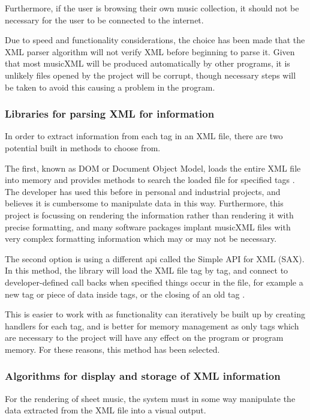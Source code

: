 Furthermore, if the user is browsing their own music collection, it should not be necessary for the user to be connected to the internet.

Due to speed and functionality considerations, the choice has been made that the XML parser algorithm will not verify XML before beginning to parse it. Given that most musicXML will be produced automatically by other programs, it is unlikely files opened by the project will be corrupt, though necessary steps will be taken to avoid this causing a problem in the program.


\subsubsection{Libraries for parsing XML for information}
In order to extract information from each tag in an XML file, there are two potential built in methods to choose from. 

The first, known as DOM or Document Object Model, loads the entire XML file into memory and provides methods to search the loaded file for specified tags \parencite{PythonDom}. The developer has used this before in personal and industrial projects, and believes it is cumbersome to manipulate data in this way. Furthermore, this project is focussing on rendering the information rather than rendering it with precise formatting, and many software packages implant musicXML files with very complex formatting information which may or may not be necessary\parencite{MusicXMLPresentation}.

The second option is using a different api called the Simple API for XML (SAX). In this method, the library will load the XML file tag by tag, and connect to developer-defined call backs when specified things occur in the file, for example a new tag or piece of data inside tags, or the closing of an old tag \parencite{PythonSax}. 

This is easier to work with as functionality can iteratively be built up by creating handlers for each tag, and is better for memory management as only tags which are necessary to the project will have any effect on the program or program memory. For these reasons, this method has been selected.



\subsubsection{Algorithms for display and storage of XML information}
For the rendering of sheet music, the system must in some way manipulate the data extracted from the XML file into a visual output.

